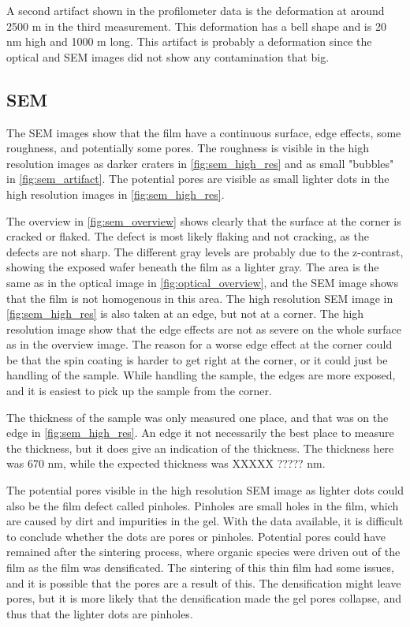 A second artifact shown in the profilometer data is the deformation at around 2500 \textmu m in the third measurement.
This deformation has a bell shape and is 20 nm high and 1000 \textmu m long.
This artifact is probably a deformation since the optical and SEM images did not show any contamination that big.


\subsection{SEM}

\noindent The SEM images show that the film have a continuous surface, edge effects, some roughness, and potentially some pores.
The roughness is visible in the high resolution images as darker craters in \autoref{fig:sem_high_res} and as small "bubbles" in \autoref{fig:sem_artifact}.
The potential pores are visible as small lighter dots in the high resolution images in \autoref{fig:sem_high_res}.

The overview in \autoref{fig:sem_overview} shows clearly that the surface at the corner is cracked or flaked.
The defect is most likely flaking and not cracking, as the defects are not sharp.
The different gray levels are probably due to the z-contrast, showing the exposed wafer beneath the film as a lighter gray.
The area is the same as in the optical image in \autoref{fig:optical_overview}, and the SEM image shows that the film is not homogenous in this area.
The high resolution SEM image in \autoref{fig:sem_high_res} is also taken at an edge, but not at a corner.
The high resolution image show that the edge effects are not as severe on the whole surface as in the overview image.
The reason for a worse edge effect at the corner could be that the spin coating is harder to get right at the corner, or it could just be handling of the sample.
While handling the sample, the edges are more exposed, and it is easiest to pick up the sample from the corner.

The thickness of the sample was only measured one place, and that was on the edge in \autoref{fig:sem_high_res}.
An edge it not necessarily the best place to measure the thickness, but it does give an indication of the thickness.
The thickness here was 670 nm, while the expected thickness was XXXXX ????? nm.


The potential pores visible in the high resolution SEM image as lighter dots could also be the film defect called pinholes.
Pinholes are small holes in the film, which are caused by dirt and impurities in the gel.
With the data available, it is difficult to conclude whether the dots are pores or pinholes.
Potential pores could have remained after the sintering process, where organic species were driven out of the film as the film was densificated.
The sintering of this thin film had some issues, and it is possible that the pores are a result of this.
The densification might leave pores, but it is more likely that the densification made the gel pores collapse, and thus that the lighter dots are pinholes.

